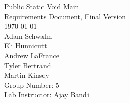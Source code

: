 \begin{titlepage}
\begin{center}

\vspace*{3.0 cm}
{\Huge Public Static Void Main}\\[0.7cm]
{\Large Requirements Document, Final Version}\\[3.8cm]
{\Large \today}\\[0.5cm]
Adam Schwalm\\
Eli Hunnicutt\\
Andrew LaFrance\\
Tyler Bertrand\\
Martin Kinsey\\[4.0cm]

Group Number: 5\\
Lab Instructor: Ajay Bandi
  

  
\end{center}
\end{titlepage}
